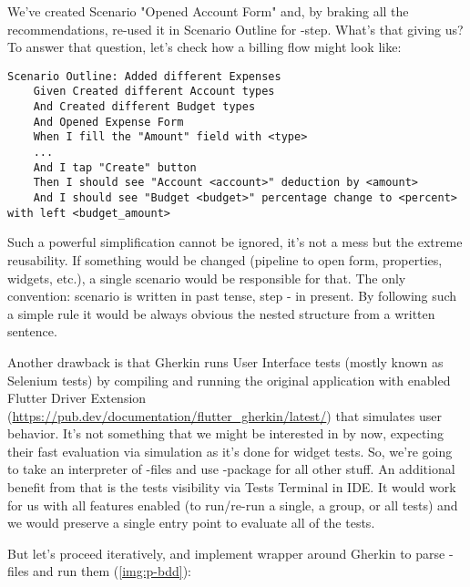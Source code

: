 We've created Scenario "Opened Account Form" and, by braking all the recommendations, re-used it in Scenario Outline 
for -step. What's that giving us? To answer that question, let's check how a billing flow might look like:

\begin{lstlisting}[language=cucumber]
  Scenario Outline: Added different Expenses
    Given Created different Account types
    And Created different Budget types
    And Opened Expense Form
    When I fill the "Amount" field with <type>
    ...
    And I tap "Create" button
    Then I should see "Account <account>" deduction by <amount>
    And I should see "Budget <budget>" percentage change to <percent> with left <budget_amount>
\end{lstlisting}

Such a powerful simplification cannot be ignored, it's not a mess but the extreme reusability. If something would be 
changed (pipeline to open form, properties, widgets, etc.), a single scenario would be responsible for that. The only 
convention: scenario is written in past tense, step - in present. By following such a simple rule it would be always 
obvious the nested structure from a written sentence. 

Another drawback is that Gherkin runs User Interface tests (mostly known as Selenium tests) by compiling and running 
the original application with enabled Flutter Driver Extension 
(\href{https://pub.dev/documentation/flutter_gherkin/latest/}{https://pub.dev/documentation/flutter\_gherkin/latest/}) 
that simulates user behavior. It's not something that we might be interested in by now, expecting their fast evaluation 
via simulation as it's done for widget tests. So, we're going to take an interpreter of -files and use 
-package for all other stuff. An additional benefit from that is the tests visibility via Tests 
Terminal in IDE. It would work for us with all features enabled (to run/re-run a single, a group, or all tests) and 
we would preserve a single entry point to evaluate all of the tests.


But let's proceed iteratively, and implement wrapper around Gherkin to parse -files and run them 
(\cref{img:p-bdd}):

